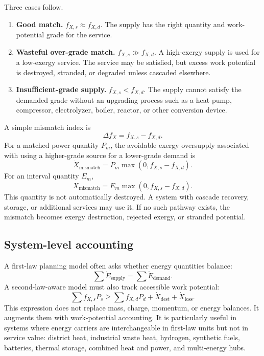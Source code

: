 \documentclass[11pt]{article}
\begin{document}
Three cases follow.

\begin{enumerate}
\item \textbf{Good match.} $f_{X,s}\approx f_{X,d}$. The supply has the right quantity and work-potential grade for the service.
\item \textbf{Wasteful over-grade match.} $f_{X,s}\gg f_{X,d}$. A high-exergy supply is used for a low-exergy service. The service may be satisfied, but excess work potential is destroyed, stranded, or degraded unless cascaded elsewhere.
\item \textbf{Insufficient-grade supply.} $f_{X,s}<f_{X,d}$. The supply cannot satisfy the demanded grade without an upgrading process such as a heat pump, compressor, electrolyzer, boiler, reactor, or other conversion device.
\end{enumerate}

A simple mismatch index is
\begin{equation}
\Delta f_X=f_{X,s}-f_{X,d}.
\end{equation}
For a matched power quantity $P_m$, the avoidable exergy oversupply associated with using a higher-grade source for a lower-grade demand is
\begin{equation}
\dot{X}_{\mathrm{mismatch}}=P_m\max(0,f_{X,s}-f_{X,d}).
\end{equation}
For an interval quantity $E_m$,
\begin{equation}
X_{\mathrm{mismatch}}=E_m\max(0,f_{X,s}-f_{X,d}).
\end{equation}
This quantity is not automatically destroyed. A system with cascade recovery, storage, or additional services may use it. If no such pathway exists, the mismatch becomes exergy destruction, rejected exergy, or stranded potential.

\subsection{System-level accounting}

A first-law planning model often asks whether energy quantities balance:
\begin{equation}
\sum \dot{E}_{\mathrm{supply}}=\sum \dot{E}_{\mathrm{demand}}.
\end{equation}
A second-law-aware model must also track accessible work potential:
\begin{equation}
\sum f_{X,s} P_s \ge \sum f_{X,d} P_d + \dot{X}_{\mathrm{dest}}+\dot{X}_{\mathrm{loss}}.
\end{equation}
This expression does not replace mass, charge, momentum, or energy balances. It augments them with work-potential accounting. It is particularly useful in systems where energy carriers are interchangeable in first-law units but not in service value: district heat, industrial waste heat, hydrogen, synthetic fuels, batteries, thermal storage, combined heat and power, and multi-energy hubs.
\end{document}
